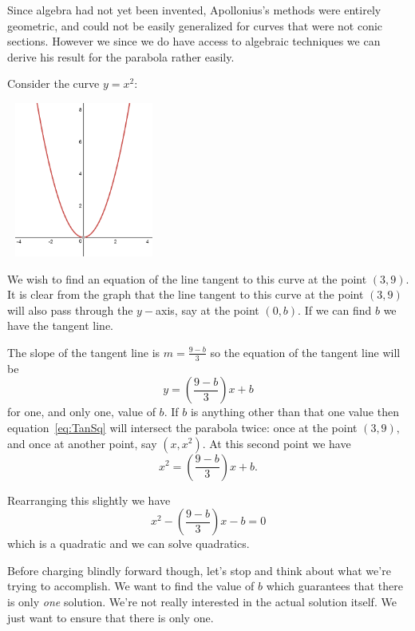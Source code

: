  Since algebra had not yet been invented, Apollonius's methods were
  entirely geometric, and could not be easily generalized for curves
  that were not conic sections. However we since we do have access to
  algebraic techniques we can derive his result for the parabola
  rather easily.

  \begin{myexample}
    Consider the curve $y=x^2:$\\
\centerline{\includegraphics*[height=2in,width=2in]{Figures/Quadratic}}
    We wish to find an equation of the line tangent to this curve at
    the point $(3,9).$
    It is clear from the graph that the line tangent to this curve at
    the point $(3,9)$ will also pass through the $y-$axis, say at
    the point $(0,b).$ If we can find $b$ we have the tangent line. 
    
    The slope of the tangent line is $m=\frac{9-b}{3}$ so the equation
    of the tangent line will be 
    \begin{equation}
      y=\left(\frac{9-b}{3}\right)x+b\label{eq:TanSq}
    \end{equation}
    for one, and only one, value of $b.$ If $b$ is anything other than
    that one value then equation~\ref{eq:TanSq} will intersect the parabola
    twice: once at the point $(3,9),$ and once at another point, say
    $(x,x^2).$ At this second point we have 
    $$
    x^2=\left(\frac{9-b}{3}\right)x+b.
    $$
    
    Rearranging this slightly we have 
    $$
    x^2-\left(\frac{9-b}{3}\right)x-b=0
    $$
    which is a quadratic and we can solve quadratics.

    Before charging blindly forward though, let's stop and think about
    what we're trying to accomplish. We want to find the value of $b$
    which guarantees that there is only \emph{one} solution. We're
    not really interested in the actual solution itself. We just want
    to ensure that there is only one.


\end{myexample}
